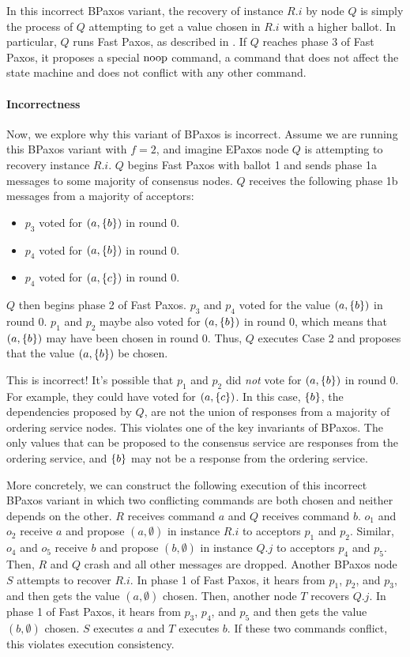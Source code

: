 \documentclass{mwhittaker}
\theoremstyle{definition}
\begin{document}
In this incorrect BPaxos variant, the recovery of instance $R.i$ by node $Q$ is
simply the process of $Q$ attempting to get a value chosen in $R.i$ with a
higher ballot. In particular, $Q$ runs Fast Paxos, as described in
. If $Q$ reaches phase 3 of Fast Paxos, it proposes a special
$\text{noop}$ command, a command that does not affect the state machine and does not
conflict with any other command.

\paragraph{Incorrectness}
Now, we explore why this variant of BPaxos is incorrect. Assume we are running
this BPaxos variant with $f = 2$, and imagine EPaxos node $Q$ is attempting to
recovery instance $R.i$. $Q$ begins Fast Paxos with ballot 1 and sends phase 1a
messages to some majority of consensus nodes. $Q$ receives the following phase
1b messages from a majority of acceptors:
\begin{itemize}
  \item
    $p_3$ voted for $(a, \{b\})$ in round $0$.
  \item
    $p_4$ voted for $(a, \{b\})$ in round $0$.
  \item
    $p_4$ voted for $(a, \{c\})$ in round $0$.
\end{itemize}

$Q$ then begins phase 2 of Fast Paxos. $p_3$ and $p_4$ voted for the value $(a,
\{b\})$ in round $0$. $p_1$ and $p_2$ maybe also voted for $(a, \{b\})$ in
round $0$, which means that $(a, \{b\})$ may have been chosen in round $0$.
Thus, $Q$ executes Case 2 and proposes that the value $(a, \{b\})$ be chosen.

This is incorrect! It's possible that $p_1$ and $p_2$ did \emph{not} vote for
$(a, \{b\})$ in round $0$. For example, they could have voted for $(a,
\{c\})$. In this case, $\{b\}$, the dependencies proposed by $Q$, are not
the union of responses from a majority of ordering service nodes. This violates
one of the key invariants of BPaxos. The only values that can be proposed to
the consensus service are responses from the ordering service, and $\{b\}$
may not be a response from the ordering service.

More concretely, we can construct the following execution of this incorrect
BPaxos variant in which two conflicting commands are both chosen and neither
depends on the other. $R$ receives command $a$ and $Q$ receives command $b$.
$o_1$ and $o_2$ receive $a$ and propose $(a, \emptyset)$ in instance $R.i$ to
acceptors $p_1$ and $p_2$. Similar, $o_4$ and $o_5$ receive $b$ and propose
$(b, \emptyset)$ in instance $Q.j$ to acceptors $p_4$ and $p_5$. Then, $R$ and
$Q$ crash and all other messages are dropped. Another BPaxos node $S$ attempts
to recover $R.i$. In phase 1 of Fast Paxos, it hears from $p_1$, $p_2$, and
$p_3$, and then gets the value $(a, \emptyset)$ chosen. Then, another node $T$
recovers $Q.j$. In phase 1 of Fast Paxos, it hears from $p_3$, $p_4$, and $p_5$
and then gets the value $(b, \emptyset)$ chosen. $S$ executes $a$ and $T$
executes $b$. If these two commands conflict, this violates execution
consistency.
\end{document}
